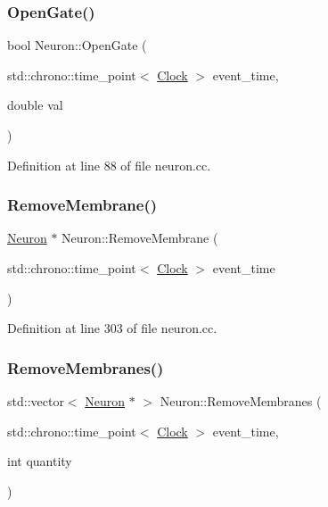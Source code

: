 \subsubsection{\texorpdfstring{Open\+Gate()}{OpenGate()}}
{\footnotesize\ttfamily bool Neuron\+::\+Open\+Gate (\begin{DoxyParamCaption}\item[{std\+::chrono\+::time\+\_\+point$<$ \mbox{\hyperlink{universe_8h_a0ef8d951d1ca5ab3cfaf7ab4c7a6fd80}{Clock}} $>$}]{event\+\_\+time,  }\item[{double}]{val }\end{DoxyParamCaption})}



Definition at line 88 of file neuron.\+cc.

\mbox{\label{class_neuron_a190ae0628482048bef95c8b318939322}} 
\subsubsection{\texorpdfstring{Remove\+Membrane()}{RemoveMembrane()}}
{\footnotesize\ttfamily \mbox{\hyperlink{class_neuron}{Neuron}} $\ast$ Neuron\+::\+Remove\+Membrane (\begin{DoxyParamCaption}\item[{std\+::chrono\+::time\+\_\+point$<$ \mbox{\hyperlink{universe_8h_a0ef8d951d1ca5ab3cfaf7ab4c7a6fd80}{Clock}} $>$}]{event\+\_\+time }\end{DoxyParamCaption})}



Definition at line 303 of file neuron.\+cc.

\mbox{\label{class_neuron_a3cd5fc6f1a354d99bb8768df7ee40552}} 
\subsubsection{\texorpdfstring{Remove\+Membranes()}{RemoveMembranes()}}
{\footnotesize\ttfamily std\+::vector$<$ \mbox{\hyperlink{class_neuron}{Neuron}} $\ast$ $>$ Neuron\+::\+Remove\+Membranes (\begin{DoxyParamCaption}\item[{std\+::chrono\+::time\+\_\+point$<$ \mbox{\hyperlink{universe_8h_a0ef8d951d1ca5ab3cfaf7ab4c7a6fd80}{Clock}} $>$}]{event\+\_\+time,  }\item[{int}]{quantity }\end{DoxyParamCaption})}



